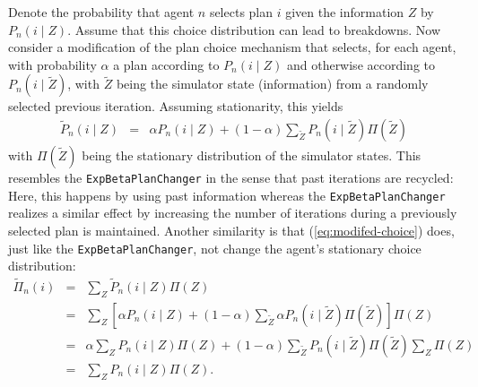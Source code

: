 Denote the probability that agent $n$ selects plan $i$ given the
information $Z$ by $P_{n}(i\mid Z)$. Assume that this choice distribution
can lead to breakdowns. Now consider a modification of the plan choice
mechanism that selects, for each agent, with probability $\alpha$
a plan according to $P_{n}(i\mid Z)$ and otherwise according to $P_{n}(i\mid\tilde{Z})$,
with $\tilde{Z}$ being the simulator state (information) from a randomly
selected previous iteration. Assuming stationarity, this yields
\begin{eqnarray}
\tilde{P}_{n}(i\mid Z) & = & \alpha P_{n}(i\mid Z)+(1-\alpha)\sum_{\tilde{Z}}P_{n}(i\mid\tilde{Z})\Pi(\tilde{Z})\label{eq:modifed-choice}
\end{eqnarray}
with $\Pi(\tilde{Z})$ being the stationary distribution of the simulator
states. This resembles the \texttt{ExpBetaPlanChanger} in the sense
that past iterations are recycled: Here, this happens by using past
information whereas the \texttt{ExpBetaPlanChanger} realizes a similar
effect by increasing the number of iterations during a previously
selected plan is maintained. Another similarity is that (\ref{eq:modifed-choice})
does, just like the \texttt{ExpBetaPlanChanger}, not change the agent's
stationary choice distribution:
\begin{eqnarray}
\tilde{\Pi}_{n}(i) & = & \sum_{Z}\tilde{P}_{n}(i\mid Z)\Pi(Z)\\
 & = & \sum_{Z}\left[\alpha P_{n}(i\mid Z)+(1-\alpha)\sum_{\tilde{Z}}\alpha P_{n}(i\mid\tilde{Z})\Pi(\tilde{Z})\right]\Pi(Z)\\
 & = & \alpha\sum_{Z}P_{n}(i\mid Z)\Pi(Z)+(1-\alpha)\sum_{\tilde{Z}}P_{n}(i\mid\tilde{Z})\Pi(\tilde{Z})\sum_{Z}\Pi(Z)\\
 & = & \sum_{Z}P_{n}(i\mid Z)\Pi(Z).
\end{eqnarray}


